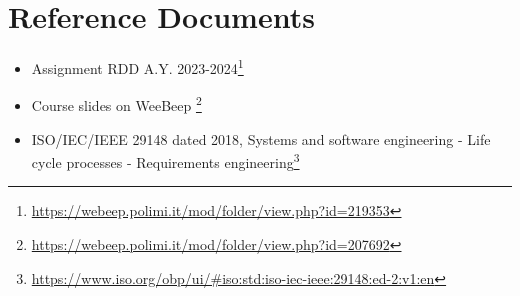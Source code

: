 \section{Reference Documents}
\begin{itemize}
    \item Assignment RDD A.Y. 2023-2024\footnote{\url{https://webeep.polimi.it/mod/folder/view.php?id=219353}}
    \item Course slides on WeeBeep \footnote{\url{https://webeep.polimi.it/mod/folder/view.php?id=207692}}
    \item ISO/IEC/IEEE 29148 dated 2018, Systems and software engineering - Life cycle processes - Requirements engineering\footnote{\url{https://www.iso.org/obp/ui/\#iso:std:iso-iec-ieee:29148:ed-2:v1:en}}
\end{itemize}

